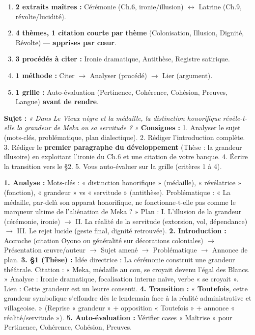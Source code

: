 \documentclass[11pt]{article}
\begin{document}
\begin{aretenir}
\begin{enumerate}
    \item \textbf{2 extraits maîtres :} Cérémonie (Ch.6, ironie/illusion) $\leftrightarrow$ Latrine (Ch.9, révolte/lucidité).
    \item \textbf{4 thèmes, 1 citation courte par thème} (Colonisation, Illusion, Dignité, Révolte) — \textbf{apprises par cœur}.
    \item \textbf{3 procédés à citer :} Ironie dramatique, Antithèse, Registre satirique.
    \item \textbf{1 méthode :} Citer $\rightarrow$ Analyser (procédé) $\rightarrow$ Lier (argument).
    \item \textbf{1 grille :} Auto-évaluation (Pertinence, Cohérence, Cohésion, Preuves, Langue) \textbf{avant de rendre}.
\end{enumerate}
\end{aretenir}

\begin{exercice}
\textbf{Sujet :} \textit{« Dans \emph{Le Vieux nègre et la médaille}, la distinction honorifique révèle-t-elle la grandeur de Meka ou sa servitude ? »}
\textbf{Consignes :} 1. Analyser le sujet (mots-clés, problématique, plan dialectique). 2. Rédiger l'introduction complète. 3. Rédiger le \textbf{premier paragraphe du développement} (Thèse : la grandeur illusoire) en exploitant l'ironie du Ch.6 et une citation de votre banque. 4. Écrire la transition vers le §2. 5. Vous auto-évaluer sur la grille (critères 1 à 4).
\end{exercice}

\begin{corrige}
\textbf{1. Analyse :} Mots-clés : « distinction honorifique » (médaille), « révélatrice » (fonction), « grandeur » vs « servitude » (antithèse). Problématique : « La médaille, par-delà son apparat honorifique, ne fonctionne-t-elle pas comme le marqueur ultime de l'aliénation de Meka ? » Plan : I. L'illusion de la grandeur (cérémonie, ironie) $\rightarrow$ II. La réalité de la servitude (extorsion, vol, dépendance) $\rightarrow$ III. Le rejet lucide (geste final, dignité retrouvée).
\textbf{2. Introduction :} Accroche (citation Oyono ou généralité sur décorations coloniales) $\rightarrow$ Présentation œuvre/auteur $\rightarrow$ Sujet amené $\rightarrow$ Problématique $\rightarrow$ Annonce de plan.
\textbf{3. §1 (Thèse) :} Idée directrice : La cérémonie construit une grandeur théâtrale. Citation : « Meka, médaille au cou, se croyait devenu l'égal des Blancs. » Analyse : Ironie dramatique, focalisation interne naïve, verbe « se croyait ». Lien : Cette grandeur est un leurre consenti.
\textbf{4. Transition :} « \textbf{Toutefois}, cette grandeur symbolique s'effondre dès le lendemain face à la réalité administrative et villageoise. » (Reprise « grandeur » + opposition « Toutefois » + annonce « réalité/servitude »).
\textbf{5. Auto-évaluation :} Vérifier cases « Maîtrise » pour Pertinence, Cohérence, Cohésion, Preuves.
\end{corrige}
\end{document}
